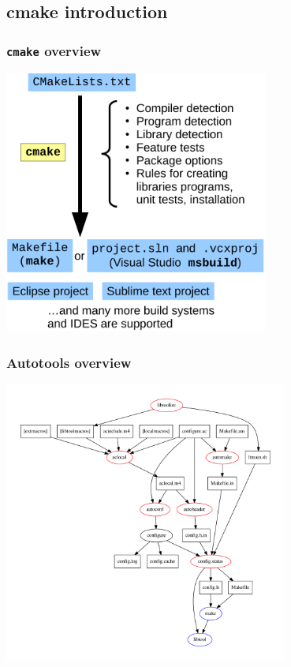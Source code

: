 \documentclass{beamer}
\newcommand{\cmd}[1]{\textbf{\texttt{#1}}}
\begin{document}
\subsection{cmake introduction}

\begin{frame}
  \frametitle{\cmd{cmake} overview}
  \medskip
  \centering
  \includegraphics[width=0.65\textwidth]{cmake-flow}
\end{frame}

\begin{frame}
  \frametitle{Autotools overview}
  \centering
  \includegraphics[width=0.7\textwidth]{autotools}
\end{frame}
\end{document}
